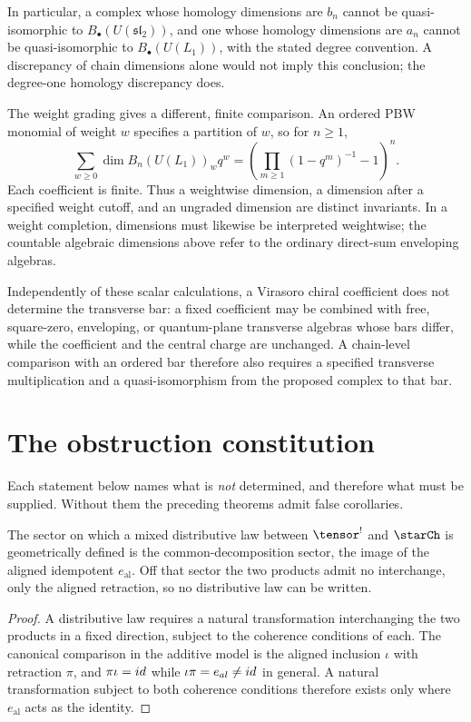 In particular, a complex whose homology dimensions are $b_n$ cannot be
quasi-isomorphic to $B_\bullet(U(\mathfrak{sl}_2))$, and one whose homology
dimensions are $a_n$ cannot be quasi-isomorphic to $B_\bullet(U(L_1))$,
with the stated degree convention.  A discrepancy of chain dimensions
alone would not imply this conclusion; the degree-one homology discrepancy
does.

The weight grading gives a different, finite comparison.  An ordered PBW
monomial of weight $w$ specifies a partition of $w$, so for $n\ge1$,
\[
 \sum_{w\ge0}\dim B_n(U(L_1))_w q^w
 =\left(\prod_{m\ge1}(1-q^m)^{-1}-1\right)^n.
\]
Each coefficient is finite.  Thus a weightwise dimension, a dimension
after a specified weight cutoff, and an ungraded dimension are distinct
invariants.  In a weight completion, dimensions must likewise be interpreted
weightwise; the countable algebraic dimensions above refer to the ordinary
direct-sum enveloping algebras.

\begin{remark}
Independently of these scalar calculations, a Virasoro chiral coefficient does not determine the transverse bar: a fixed coefficient may be combined with free, square-zero, enveloping, or quantum-plane transverse algebras whose bars differ, while the coefficient and the central charge are unchanged. A chain-level comparison with an ordered bar therefore also requires a specified transverse multiplication and a quasi-isomorphism from the proposed complex to that bar.
\end{remark}

\chapter{The obstruction constitution}
\label{ch:obstructions}

Each statement below names what is \emph{not} determined, and therefore what
must be supplied. Without them the preceding theorems admit false corollaries.

\begin{proposition}
\label{prop:lambda-sector-spine}
The sector on which a mixed distributive law between $\tensor^!$ and $\starCh$
is geometrically defined is the common-decomposition sector, the image of the
aligned idempotent $e_{\mathrm{al}}$. Off that sector the two products admit no
interchange, only the aligned retraction, so no distributive law can be
written.
\end{proposition}
\begin{proof}
A distributive law requires a natural transformation interchanging the two
products in a fixed direction, subject to the coherence conditions of each. The
canonical comparison in the additive model is the aligned inclusion $\iota$ with
retraction $\pi$, and $\pi\iota=id$ while $\iota\pi=e_{al}\ne id$ in
general. A natural transformation subject to both coherence conditions
therefore exists only where $e_{\mathrm{al}}$ acts as the identity.
\end{proof}


